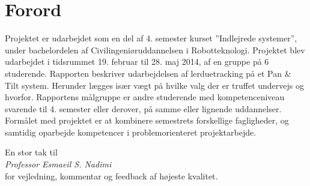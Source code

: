 \section*{Forord}
Projektet er udarbejdet som en del af 4. semester kurset ”Indlejrede systemer”, under bachelordelen af Civilingeniøruddannelsen i Robotteknologi. 
Projektet blev udarbejdet i tidsrummet 19. februar til 28. maj 2014, af en gruppe på 6 studerende.
Rapporten beskriver udarbejdelsen af lerduetracking på et Pan \& Tilt system. 
Herunder lægges især vægt på hvilke valg der er truffet undervejs og hvorfor. 
Rapportens målgruppe er andre studerende med kompetenceniveau svarende til 4. semester eller derover, på samme eller lignende uddannelser.
Formålet med projektet er at kombinere semestrets forskellige fagligheder, og samtidig oparbejde kompetencer i problemorienteret projektarbejde.
\bigskip
\begin{center}
En stor tak til \\
\textit{Professor Esmaeil S. Nadimi} \\ 
for vejledning, kommentar og feedback af højeste kvalitet.
\end{center}





